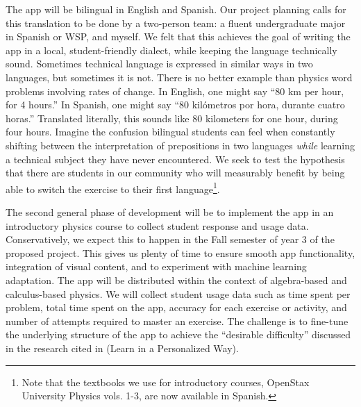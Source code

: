 \documentclass[../../main.tex]{subfiles}
\begin{document}
The app will be bilingual in English and Spanish.  Our project planning calls for this translation to be done by a two-person team: a fluent undergraduate major in Spanish or WSP, and myself.  We felt that this achieves the goal of writing the app in a local, student-friendly dialect, while keeping the language technically sound.  Sometimes technical language is expressed in similar ways in two languages, but sometimes it is not.  There is no better example than physics word problems involving rates of change.  In English, one might say ``80 km per hour, for 4 hours.''  In Spanish, one might say ``80 kil\'{o}metros por hora, durante cuatro horas.''  Translated literally, this sounds like 80 kilometers for one hour, during four hours.  Imagine the confusion bilingual students can feel when constantly shifting between the interpretation of prepositions in two languages \textit{while} learning a technical subject they have never encountered.  We seek to test the hypothesis that there are students in our community who will measurably benefit by being able to switch the exercise to their first language\footnote{Note that the textbooks we use for introductory courses, OpenStax University Physics vols. 1-3, are now available in Spanish.}. \\ \vspace{2.5mm}

The second general phase of development will be to implement the app in an introductory physics course to collect student response and usage data.  Conservatively, we expect this to happen in the Fall semester of year 3 of the proposed project.  This gives us plenty of time to ensure smooth app functionality, integration of visual content, and to experiment with machine learning adaptation.  The app will be distributed within the context of algebra-based and calculus-based physics.  We will collect student usage data such as time spent per problem, total time spent on the app, accuracy for each exercise or activity, and number of attempts required to master an exercise.  The challenge is to fine-tune the underlying structure of the app to achieve the ``desirable difficulty'' discussed in the research cited in \cite{duolingo_whitepaper} (Learn in a Personalized Way).  \\ \vspace{2.5mm}
\end{document}
